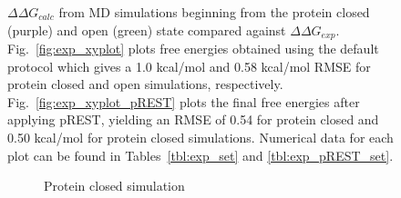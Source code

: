 \begin{figure}[!ht]
\begin{subfigure}{.5\textwidth}
\end{subfigure}\hfill
\caption{$\Delta\Delta G_{calc}$ from MD simulations beginning from the protein closed (purple) and open (green) state compared against $\Delta\Delta G_{exp}$. 
Fig.~\ref{fig:exp_xyplot} plots free energies obtained using the default protocol which gives a 1.0 kcal/mol and 0.58 kcal/mol RMSE for protein closed and open simulations, respectively. 
Fig.~\ref{fig:exp_xyplot_pREST} plots the final free energies after applying pREST, yielding an RMSE of 0.54 for protein closed and 0.50 kcal/mol for protein closed simulations.
Numerical data for each plot can be found in Tables~\ref{tbl:exp_set} and \ref{tbl:exp_pREST_set}.
} 
\label{fig:exp-xyplots}
\end{figure}


\begin{figure}[!ht]
\begin{subfigure}{\textwidth}
   \centering
    \caption{Protein closed simulation}
   \label{fig:c_exp_opls3_11/RMSD-replica11}
\end{subfigure}
\centering
\begin{subfigure}{\textwidth}
  \centering

\end{subfigure}
\end{figure}
